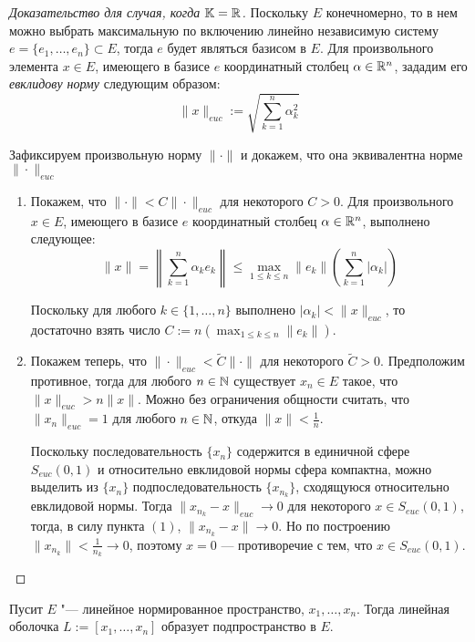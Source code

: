\begin{proof}[Доказательство для случая, когда {$\mathbb{K} = \mathbb{R}$}]
	Поскольку $E$ конечномерно, то в нем можно выбрать максимальную по включению линейно независимую систему $e = \{e_1, \dotsc, e_n\} \subset E$, тогда $e$ будет являться базисом в $E$. Для произвольного элемента $x \in E$, имеющего в базисе $e$ координатный столбец $\alpha \in \mathbb{R}^n$, зададим его \textit{евклидову норму} следующим образом:
	\[\|x\|_{euc} := \sqrt{\sum_{k = 1}^n \alpha_k^2}\]

	Зафиксируем произвольную норму $\|\cdot\|$ и докажем, что она эквивалентна норме $\|\cdot\|_{euc}$
	\begin{enumerate}
		\item Покажем, что $\|\cdot\| < C \|\cdot\|_{euc}$ для некоторого $C > 0$. Для произвольного $x \in E$, имеющего в базисе $e$ координатный столбец $\alpha \in \mathbb{R}^n$, выполнено следующее:
		\[\|x\| = \left\|\sum_{k = 1}^n\alpha_k e_k \right\| \le \max_{1 \le k \le n}\|e_k\|\left(\sum_{k = 1}^n|\alpha_k|\right)\]
  
		Поскольку для любого $k \in \{1, \dotsc, n\}$ выполнено $|\alpha_k| < \|x\|_{euc}$, то достаточно взять число $C := n(\max_{1 \le k \le n}\|e_k\|)$.

		\item Покажем теперь, что $\|\cdot\|_{euc} < \widetilde C \|\cdot\|$ для некоторого $\widetilde C > 0$. Предположим противное, тогда для любого $n \in \mathbb{N}$ существует $x_n \in E$ такое, что $\|x\|_{euc} > n\|x\|$. Можно без ограничения общности считать, что $\|x_n\|_{euc} = 1$ для любого $n \in \mathbb{N}$, откуда $\|x\| < \frac 1n$.
		
		Поскольку последовательность $\{x_n\}$ содержится в единичной сфере $S_{euc}(0, 1)$ и относительно евклидовой нормы сфера компактна, можно выделить из $\{x_n\}$ подпоследовательность $\{x_{n_k}\}$, сходящуюся относительно евклидовой нормы. Тогда $\|x_{n_k} - x\|_{euc} \to 0$ для некоторого $x \in S_{euc}(0, 1)$, тогда, в силу пункта $(1)$, $\|x_{n_k} - x\| \to 0$. Но по построению $\|x_{n_k}\| < \frac 1{n_k}\to 0$, поэтому $x = 0$ --- противоречие с тем, что $x \in S_{euc}(0, 1)$.\qedhere
	\end{enumerate}
\end{proof}

\begin{corollary}
	Пусит $E$ "--- линейное нормированное пространство, $x_1, \dotsc, x_n$. Тогда линейная оболочка $L := [x_1, \dotsc, x_n]$ образует подпространство в $E$.
\end{corollary}

